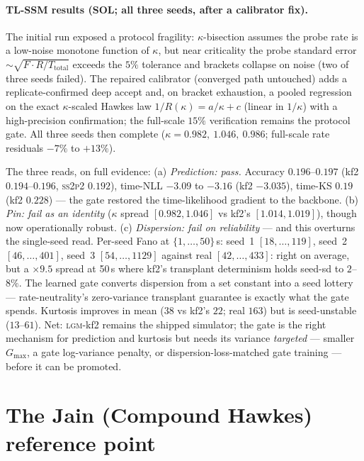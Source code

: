 \documentclass[11pt]{article}
\newcommand{\sspp}{\textsc{ss2p2}}
\newcommand{\lgm}{\textsc{lgm}}
\begin{document}
\paragraph{TL-SSM results (SOL; all three seeds, after a calibrator fix).}
The initial run exposed a protocol fragility: $\kappa$-bisection assumes the
probe rate is a low-noise monotone function of $\kappa$, but near criticality
the probe standard error $\sim\sqrt{F\cdot R/T_{\text{total}}}$ exceeds the
$5\%$ tolerance and brackets collapse on noise (two of three seeds failed).
The repaired calibrator (converged path untouched) adds a replicate-confirmed
deep accept and, on bracket exhaustion, a pooled regression on the exact
$\kappa$-scaled Hawkes law $1/R(\kappa)= a/\kappa + c$ (linear in $1/\kappa$)
with a high-precision confirmation; the full-scale $15\%$ verification remains
the protocol gate. All three seeds then complete
($\kappa = 0.982,\ 1.046,\ 0.986$; full-scale rate residuals $-7\%$ to $+13\%$).

The three reads, on full evidence: (a) \emph{Prediction: pass.} Accuracy
$0.196$--$0.197$ (kf2 $0.194$--$0.196$, \sspp{} $0.192$), time-NLL $-3.09$ to
$-3.16$ (kf2 $-3.035$), time-KS $0.19$ (kf2 $0.228$) --- the gate restored the
time-likelihood gradient to the backbone. (b) \emph{Pin: fail as an identity}
($\kappa$ spread $[0.982, 1.046]$ vs kf2's $[1.014,1.019]$), though now
operationally robust. (c) \emph{Dispersion: fail on reliability} --- and this
overturns the single-seed read. Per-seed Fano at $\{1,\dots,50\}$\,s:
seed~1 $[18,\dots,119]$, seed~2 $[46,\dots,401]$, seed~3 $[54,\dots,1129]$
against real $[42,\dots,433]$: right on average, but a $\times 9.5$ spread at
50\,s where kf2's transplant determinism holds seed-sd to $2$--$8\%$. The
learned gate converts dispersion from a set constant into a seed lottery ---
rate-neutrality's zero-variance transplant guarantee is exactly what the gate
spends. Kurtosis improves in mean ($38$ vs kf2's $22$; real $163$) but is
seed-unstable ($13$--$61$). Net: \lgm{}-kf2 remains the shipped simulator; the
gate is the right mechanism for prediction and kurtosis but needs its variance
\emph{targeted} --- smaller $G_{\max}$, a gate log-variance penalty, or
dispersion-loss-matched gate training --- before it can be promoted.

\section{The Jain (Compound Hawkes) reference point}
\end{document}
